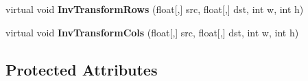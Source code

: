 \begin{DoxyCompactItemize}
\item 
\hypertarget{class_turbo_wavelets_1_1_wavelet2_d_a9109cf50d757e7cda895ce0965134f76}{virtual void {\bfseries \-Inv\-Transform\-Rows} (float\mbox{[},\mbox{]} src, float\mbox{[},\mbox{]} dst, int w, int h)}\label{class_turbo_wavelets_1_1_wavelet2_d_a9109cf50d757e7cda895ce0965134f76}

\item 
\hypertarget{class_turbo_wavelets_1_1_wavelet2_d_a08ab1e9de65415589726214fa8b45ae2}{virtual void {\bfseries \-Inv\-Transform\-Cols} (float\mbox{[},\mbox{]} src, float\mbox{[},\mbox{]} dst, int w, int h)}\label{class_turbo_wavelets_1_1_wavelet2_d_a08ab1e9de65415589726214fa8b45ae2}

\end{DoxyCompactItemize}
\subsection*{\-Protected \-Attributes}
